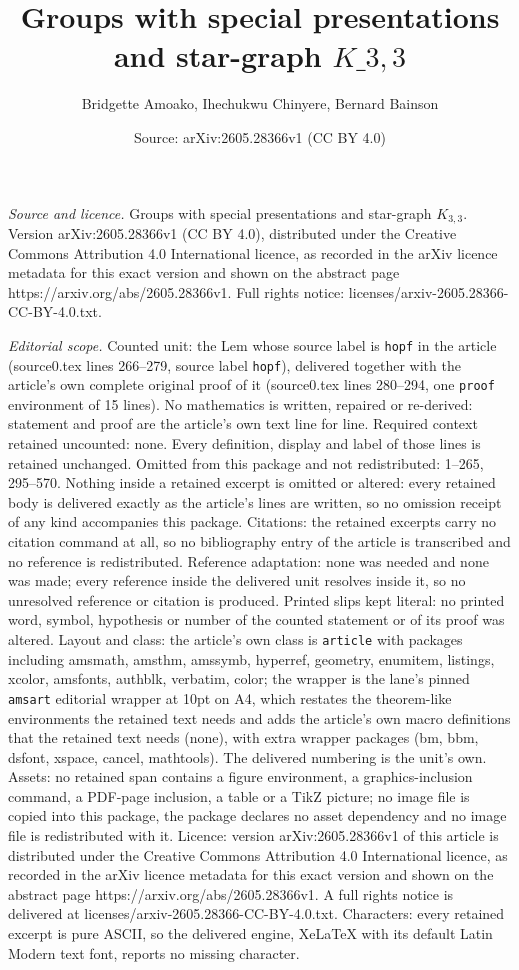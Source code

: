 \documentclass[10pt,a4paper]{amsart}
\title[Groups with special presentations and star-graph $K\_{3,3}$]{Groups with special presentations and star-graph $K\_{3,3}$}
\author{Bridgette Amoako, Ihechukwu Chinyere, Bernard Bainson}
\date{Source: arXiv:2605.28366v1 (CC BY 4.0)}
\begin{document}
\maketitle

\noindent\emph{Source and licence.} Groups with special presentations and star-graph $K_{3,3}$. Version arXiv:2605.28366v1 (CC BY 4.0), distributed under the Creative Commons Attribution 4.0 International licence, as recorded in the arXiv licence metadata for this exact version and shown on the abstract page https://arxiv.org/abs/2605.28366v1. Full rights notice: licenses/arxiv-2605.28366-CC-BY-4.0.txt.\par\smallskip

\noindent\textit{Editorial scope.} Counted unit: the Lem whose source label is \texttt{hopf} in the article (source0.tex lines 266--279, source label \texttt{hopf}), delivered together with the article's own complete original proof of it (source0.tex lines 280--294, one \texttt{proof} environment of 15 lines). No mathematics is written, repaired or re-derived: statement and proof are the article's own text line for line. Required context retained uncounted: none. Every definition, display and label of those lines is retained unchanged. Omitted from this package and not redistributed: 1--265, 295--570. Nothing inside a retained excerpt is omitted or altered: every retained body is delivered exactly as the article's lines are written, so no omission receipt of any kind accompanies this package. Citations: the retained excerpts carry no citation command at all, so no bibliography entry of the article is transcribed and no reference is redistributed. Reference adaptation: none was needed and none was made; every reference inside the delivered unit resolves inside it, so no unresolved reference or citation is produced. Printed slips kept literal: no printed word, symbol, hypothesis or number of the counted statement or of its proof was altered. Layout and class: the article's own class is \texttt{article} with packages including amsmath, amsthm, amssymb, hyperref, geometry, enumitem, listings, xcolor, amsfonts, authblk, verbatim, color; the wrapper is the lane's pinned \texttt{amsart} editorial wrapper at 10pt on A4, which restates the theorem-like environments the retained text needs and adds the article's own macro definitions that the retained text needs (none), with extra wrapper packages (bm, bbm, dsfont, xspace, cancel, mathtools). The delivered numbering is the unit's own. Assets: no retained span contains a figure environment, a graphics-inclusion command, a PDF-page inclusion, a table or a TikZ picture; no image file is copied into this package, the package declares no asset dependency and no image file is redistributed with it. Licence: version arXiv:2605.28366v1 of this article is distributed under the Creative Commons Attribution 4.0 International licence, as recorded in the arXiv licence metadata for this exact version and shown on the abstract page https://arxiv.org/abs/2605.28366v1. A full rights notice is delivered at licenses/arxiv-2605.28366-CC-BY-4.0.txt. Characters: every retained excerpt is pure ASCII, so the delivered engine, XeLaTeX with its default Latin Modern text font, reports no missing character.
\end{document}
